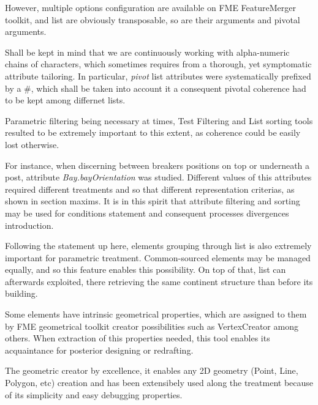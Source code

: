 However, multiple options configuration are available on FME FeatureMerger toolkit, and list are obviously transposable, so are their arguments and pivotal arguments.


Shall be kept in mind that we are continuously working with alpha-numeric chains of characters, which sometimes requires from a thorough, yet symptomatic attribute tailoring. In particular, \textit{pivot} list attributes were systematically prefixed by a #, which shall be taken into account it a consequent pivotal coherence had to be kept among differnet lists. 


Parametric filtering being necessary at times, Test Filtering and List sorting tools resulted to be extremely important to this extent, as coherence could be easily lost otherwise.

For instance, when discerning between breakers positions on top or underneath a post, attribute \textit{Bay.bayOrientation} was studied. Different values of this attributes required different treatments and so that different representation criterias, as shown in  section maxims. It is in this spirit that attribute filtering and sorting may be used for conditions statement and consequent processes divergences introduction.


Following the statement up here, elements grouping through list is also extremely important for parametric treatment. Common-sourced elements may be managed equally, and so this feature enables this possibility. On top of that, list can afterwards exploited, there retrieving the same continent structure than before its building.


Some elements have intrinsic geometrical properties, which are assigned to them by FME geometrical toolkit creator possibilities such as VertexCreator among others. When extraction of this properties needed, this tool enables its acquaintance for posterior designing or redrafting.


The geometric creator by excellence, it enables any 2D geometry (Point, Line, Polygon, etc) creation and has been extensibely used along the treatment because of its simplicity and easy debugging properties.

